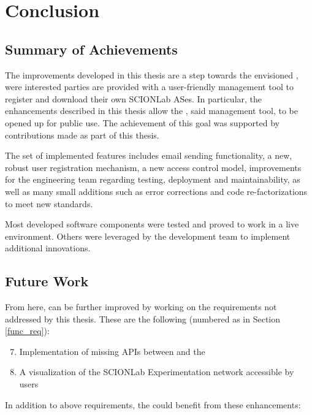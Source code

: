 \chapter{Conclusion}

\section{Summary of Achievements}

The improvements developed in this thesis are a step towards the envisioned \lee, were interested parties are provided with a user-friendly management tool to register and download their own SCIONLab ASes. In particular, the enhancements described in this thesis allow the \lcs, said management tool, to be opened up for public use. The achievement of this goal was supported by contributions made as part of this thesis.

The set of implemented features includes email sending functionality, a new, robust user registration mechanism, a new access control model, improvements for the engineering team regarding testing, deployment and maintainability, as well as many small additions such as error corrections and code re-factorizations to meet new standards.

Most developed software components were tested and proved to work in a live environment. Others were leveraged by the development team to implement additional innovations.

\section{Future Work}

From here, \lcs can be further improved by working on the requirements not addressed by this thesis. These are the following (numbered as in Section \ref{func_req}):

\begin{enumerate}
	\setcounter{enumi}{6}
	\item Implementation of missing APIs between \cords and the \lmi
	\item A visualization of the SCIONLab Experimentation network accessible by users
\end{enumerate}

In addition to above requirements, the \lcs could benefit from these enhancements:

